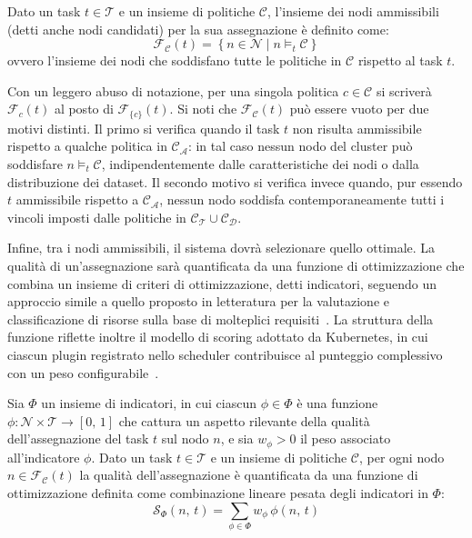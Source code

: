 \begin{definition}
    \label{def:nodi_ammissibili}
    Dato un task $t \in \mathcal{T}$ e un insieme di politiche $\mathcal{C}$, l'insieme dei nodi ammissibili (detti anche nodi candidati) per la sua assegnazione è definito come:
    \begin{equation}
        \mathcal{F_C}(t) = \left\{n \in \mathcal{N} \mid n \models_t \mathcal{C} \right\}
    \end{equation}
    ovvero l'insieme dei nodi che soddisfano tutte le politiche in $\mathcal{C}$ rispetto al task $t$.
\end{definition}

Con un leggero abuso di notazione, per una singola politica $c \in \mathcal{C}$ si scriverà $\mathcal{F}_c(t)$ al posto di $\mathcal{F}_{\{c\}}(t)$. Si noti che $\mathcal{F_C}(t)$ può essere vuoto per due motivi distinti. Il primo si verifica quando il task $t$ non risulta ammissibile rispetto a qualche politica in $\mathcal{C_A}$: in tal caso nessun nodo del cluster può soddisfare $n \models_t \mathcal{C}$, indipendentemente dalle caratteristiche dei nodi o dalla distribuzione dei dataset. Il secondo motivo si verifica invece quando, pur essendo $t$ ammissibile rispetto a $\mathcal{C_A}$, nessun nodo soddisfa contemporaneamente tutti i vincoli imposti dalle politiche in $\mathcal{C_T} \cup \mathcal{C_D}$.

Infine, tra i nodi ammissibili, il sistema dovrà selezionare quello ottimale. La qualità di un'assegnazione sarà quantificata da una funzione di ottimizzazione che combina un insieme di criteri di ottimizzazione, detti indicatori, seguendo un approccio simile a quello proposto in letteratura per la valutazione e classificazione di risorse sulla base di molteplici requisiti~\cite{cloud-plan-selection-req-multiple-app, supporting-user-requirement-pref-cloud}. La struttura della funzione riflette inoltre il modello di scoring adottato da Kubernetes, in cui ciascun plugin registrato nello scheduler contribuisce al punteggio complessivo con un peso configurabile~\cite{k8s-scheduler, k8s-scheduler-framework, k8s-scheduler-config}.

\begin{definition}
    \label{def:funzione_score}
    Sia $\Phi$ un insieme di indicatori, in cui ciascun $\phi \in \Phi$ è una funzione $\phi: \mathcal{N} \times \mathcal{T} \rightarrow [0,\, 1]$ che cattura un aspetto rilevante della qualità dell'assegnazione del task $t$ sul nodo $n$, e sia $w_\phi > 0$ il peso associato all'indicatore $\phi$. Dato un task $t \in \mathcal{T}$ e un insieme di politiche $\mathcal{C}$, per ogni nodo $n \in \mathcal{F_C}(t)$ la qualità dell'assegnazione è quantificata da una funzione di ottimizzazione definita come combinazione lineare pesata degli indicatori in $\Phi$:
    \begin{equation}
        \mathcal{S}_\Phi(n,\, t) = \sum_{\phi \in \Phi} w_\phi\, \phi(n,\, t)
    \end{equation}
\end{definition}

